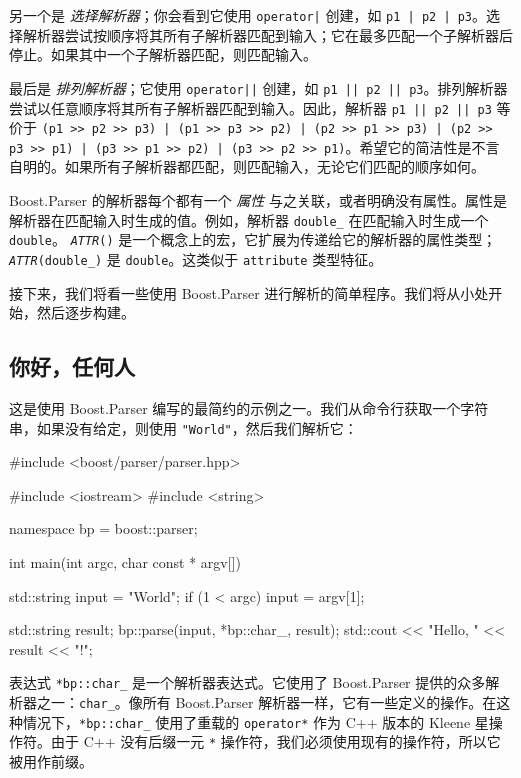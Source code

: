另一个是 \emph{选择解析器}；你会看到它使用 \texttt{operator|} 创建，如 \texttt{p1 | p2 | p3}。选择解析器尝试按顺序将其所有子解析器匹配到输入；它在最多匹配一个子解析器后停止。如果其中一个子解析器匹配，则匹配输入。

最后是 \emph{排列解析器}；它使用 \texttt{operator||} 创建，如 \texttt{p1 || p2 || p3}。排列解析器尝试以任意顺序将其所有子解析器匹配到输入。因此，解析器 \texttt{p1 || p2 || p3} 等价于 \texttt{(p1 >> p2 >> p3) | (p1 >> p3 >> p2) | (p2 >> p1 >> p3) | (p2 >> p3 >> p1) | (p3 >> p1 >> p2) | (p3 >> p2 >> p1)}。希望它的简洁性是不言自明的。如果所有子解析器都匹配，则匹配输入，无论它们匹配的顺序如何。

Boost.Parser 的解析器每个都有一个 \emph{属性} 与之关联，或者明确没有属性。属性是解析器在匹配输入时生成的值。例如，解析器 \texttt{double\_} 在匹配输入时生成一个 \texttt{double}。 \emph{\texttt{ATTR}}\texttt{()} 是一个概念上的宏，它扩展为传递给它的解析器的属性类型；\emph{\texttt{ATTR}}\texttt{(double\_)} 是 \texttt{double}。这类似于 \texttt{attribute} 类型特征。

接下来，我们将看一些使用 Boost.Parser 进行解析的简单程序。我们将从小处开始，然后逐步构建。

\subsection{你好，任何人}

这是使用 Boost.Parser 编写的最简约的示例之一。我们从命令行获取一个字符串，如果没有给定，则使用 \texttt{"World"}，然后我们解析它：

\begin{code}
#include <boost/parser/parser.hpp>

#include <iostream>
#include <string>


namespace bp = boost::parser;

int main(int argc, char const * argv[])
{
    std::string input = "World";
    if (1 < argc)
        input = argv[1];

    std::string result;
    bp::parse(input, *bp::char_, result);
    std::cout << "Hello, " << result << "!\n";
}
\end{code}

表达式 \texttt{*bp::char\_} 是一个解析器表达式。它使用了 Boost.Parser 提供的众多解析器之一：\texttt{char\_}。像所有 Boost.Parser 解析器一样，它有一些定义的操作。在这种情况下，\texttt{*bp::char\_} 使用了重载的 \texttt{operator*} 作为 C++ 版本的 Kleene 星操作符。由于 C++ 没有后缀一元 \texttt{*} 操作符，我们必须使用现有的操作符，所以它被用作前缀。

